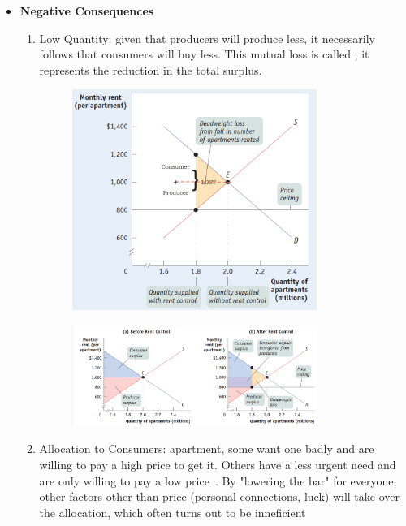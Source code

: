 \documentclass[english,course,draft]{Notes}
\begin{document}
\begin{itemize}
	\item \textbf{Negative Consequences}
	\begin{enumerate}
		\item Low Quantity: given that producers will produce less, it necessarily follows that consumers will buy less. This mutual loss is called , it represents the reduction in the total surplus.
		
		
		\begin{figure}[h]
\centering
\includegraphics[height=0.4\textwidth,width=0.8\textwidth]{deadweight}
\end{figure}
\begin{figure}[h]
\centering
\includegraphics[height=0.4\textwidth,width=0.8\textwidth]{deadweight2}
\end{figure}
	
	\item Allocation to Consumers: apartment, some want one badly and are willing to pay a high price to get it. Others have a less urgent need and are only willing to pay a low price~. By "lowering the bar" for everyone, other factors other than price (personal connections, luck) will take over the allocation, which often turns out to be inneficient
		

\end{enumerate}
\end{itemize}
\end{document}
